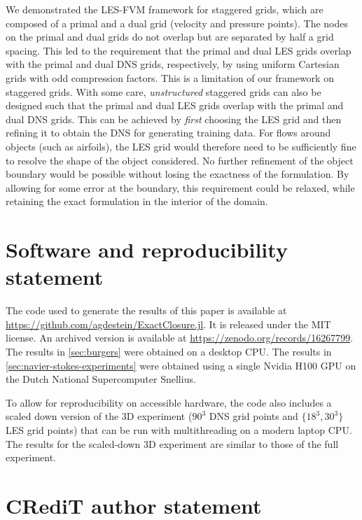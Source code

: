 \documentclass[preprint,twocolumn,5p]{elsarticle}
\begin{document}
We demonstrated the LES-FVM framework for staggered grids, which are
composed of a primal and a dual grid (velocity and pressure points). The nodes
on the primal and dual grids do not overlap but are separated by half a grid
spacing. This led to the requirement that the primal and dual LES grids
overlap with the primal and dual DNS grids, respectively, by using
uniform Cartesian grids with odd compression factors. This is a limitation of
our framework on staggered grids. With some care, \emph{unstructured} staggered
grids can also be designed such that the primal and dual LES grids overlap with
the primal and dual DNS grids. This can be achieved by \emph{first} choosing
the LES grid and then refining it to obtain the DNS for generating training
data. For flows around objects (such as airfoils), the LES grid would therefore
need to be sufficiently fine to resolve the shape of the object considered. No
further refinement of the object boundary would be possible without losing the
exactness of the formulation. By allowing for some error at the boundary, this
requirement could be relaxed, while retaining the exact formulation in the
interior of the domain.



\section*{Software and reproducibility statement}

The code used to generate the results of this paper is available at
\url{https://github.com/agdestein/ExactClosure.jl}.
It is released under the MIT license.
An archived version is available at
\url{https://zenodo.org/records/16267799}.
The results in \cref{sec:burgers} were obtained on a desktop CPU.
The results in \cref{sec:navier-stokes-experiments} were obtained
using a single Nvidia H100 GPU on the Dutch National Supercomputer Snellius.

To allow for reproducibility on accessible hardware,
the code also includes a scaled down version of the 3D experiment
($90^3$ DNS grid points and $\{ 18^3, 30^3 \}$ LES grid points)
that can be run with multithreading on a modern laptop CPU.
The results for the scaled-down 3D experiment are
similar to those of the full experiment.

\section*{CRediT author statement}
\end{document}
